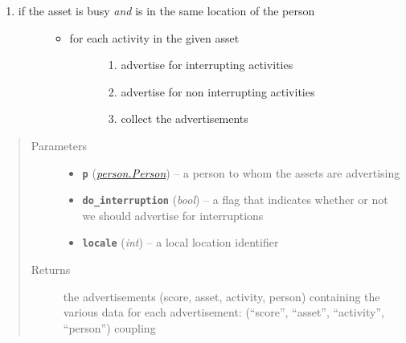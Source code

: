 \documentclass[letterpaper,10pt,english]{sphinxmanual}
\begin{document}
\begin{fulllineitems}
\begin{fulllineitems}
\begin{enumerate}
\item {} \begin{description}
\item[{if the asset is busy \emph{and} is in the same location of the person}] \leavevmode\begin{itemize}
\item {} \begin{description}
\item[{for each activity in the given asset}] \leavevmode\begin{enumerate}
\item {} 
advertise for interrupting activities

\item {} 
advertise for non interrupting activities

\item {} 
collect the advertisements

\end{enumerate}

\end{description}

\end{itemize}

\end{description}

\end{enumerate}
\begin{quote}\begin{description}
\item[{Parameters}] \leavevmode\begin{itemize}
\item {} 
\textbf{\texttt{p}} ({\hyperref[person:person.Person]{\emph{\emph{person.Person}}}}) -- a person to whom the assets are advertising

\item {} 
\textbf{\texttt{do\_interruption}} (\emph{bool}) -- a flag that indicates whether or not we should advertise for interruptions

\item {} 
\textbf{\texttt{locale}} (\emph{int}) -- a local location identifier

\end{itemize}

\item[{Returns}] \leavevmode
the advertisements (score, asset, activity, person) containing the various data for                         each advertisement: (``score'', ``asset'', ``activity'', ``person'') coupling


\end{description}
\end{quote}
\end{fulllineitems}
\end{fulllineitems}
\end{document}
